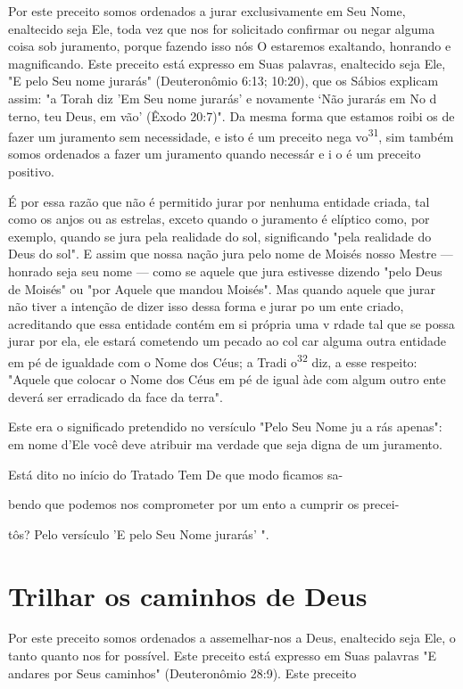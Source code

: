 \begin{itemize}
\begin{enumrate}
\begin{itemize}
Por este preceito somos ordenados a jurar exclusivamente em Seu Nome,
enaltecido seja Ele, toda vez que nos for solicitado confirmar ou negar
alguma coisa sob juramento, porque fazendo isso nós O estaremos
exaltando, honrando e magnificando. Este preceito está expresso em Suas
palavras, enal­tecido seja Ele, "E pelo Seu nome jurarás" (Deuteronômio
6:13; 10:20), que os Sábios explicam assim: "a Torah diz 'Em Seu nome
jurarás' e novamente `Não jurarás em No d terno, teu Deus, em vão'
(Êxodo 20:7)". Da mesma forma que estamos roibi os de fazer um juramento
sem necessidade, e isto é um preceito nega vo\textsuperscript{31}, sim
também somos ordenados a fazer um juramen­to quando necessár {e} i o é
um preceito positivo.

É por essa razão que não é permitido jurar por nenhuma entidade criada,
tal como os anjos ou as estrelas, exceto quando o juramento é elíptico
como, por exemplo, quando se jura pela realidade do sol, significando
"pela realidade do Deus do sol". E assim que nossa nação jura pelo nome
de Moisés nosso Mestre --- honrado seja seu nome --- como se aquele que
jura estivesse dizendo "pelo Deus de Moisés" ou "por Aquele que mandou
Moisés". Mas quan­do aquele que jurar não tiver a intenção de dizer isso
dessa forma e jurar po um ente criado, acreditando que essa entidade
contém em si própria uma v r­dade tal que se possa jurar por ela, ele
estará cometendo um pecado ao col car alguma outra entidade em pé de
igualdade com o Nome dos Céus; a Tradi o\textsuperscript{32} diz, a esse
respeito: "Aquele que colocar o Nome dos Céus em pé de igual àde com
algum outro ente deverá ser erradicado da face da terra".

Este era o significado pretendido no versículo "Pelo Seu Nome ju a­ rás
apenas": em nome d'Ele você deve atribuir ma verdade que seja digna de
um juramento.

Está dito no início do Tratado Tem De que modo ficamos sa-

bendo que podemos nos comprometer por um ento a cumprir os precei-

tôs? Pelo versículo 'E pelo Seu Nome jurarás' ".

\section{Trilhar os caminhos de Deus}

Por este preceito somos ordenados a assemelhar-nos a Deus, enalte­cido
seja Ele, o tanto quanto nos for possível. Este preceito está expresso
em Suas palavras "E andares por Seus caminhos" (Deuteronômio 28:9). Este
preceito



\end{itemize}
\end{enumrate}
\end{itemize}
